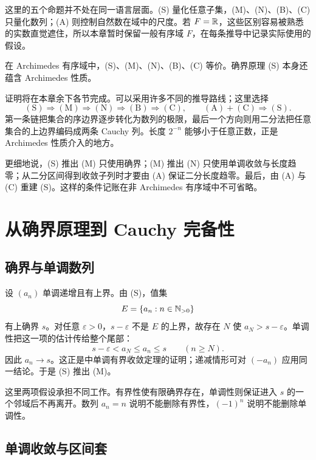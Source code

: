 这里的五个命题并不处在同一语言层面。(S) 量化任意子集，(M)、(N)、(B)、(C) 只量化数列；(A) 则控制自然数在域中的尺度。若 \(F=\mathbb{R}\)，这些区别容易被熟悉的实数直觉遮住，所以本章暂时保留一般有序域 \(F\)，在每条推导中记录实际使用的假设。

\begin{theorem}[完备性命题的等价性]
在 Archimedes 有序域中，(S)、(M)、(N)、(B)、(C) 等价。确界原理 (S) 本身还蕴含 Archimedes 性质。
\end{theorem}

证明将在本章余下各节完成。可以采用许多不同的推导路线；这里选择
\[
 \mathrm{(S)}\Longrightarrow\mathrm{(M)}
 \Longrightarrow\mathrm{(N)}
 \Longrightarrow\mathrm{(B)}
 \Longrightarrow\mathrm{(C)},
 \qquad
 \mathrm{(A)}+\mathrm{(C)}\Longrightarrow\mathrm{(S)}.
\]
第一条链把集合的序边界逐步转化为数列的极限，最后一个方向则用二分法把任意集合的上边界编码成两条 Cauchy 列。长度 \(2^{-n}\) 能够小于任意正数，正是 Archimedes 性质介入的地方。

更细地说，(S) 推出 (M) 只使用确界；(M) 推出 (N) 只使用单调收敛与长度趋零；从二分区间得到收敛子列时才要由 (A) 保证二分长度趋零。最后，由 (A) 与 (C) 重建 (S)。这样的条件记账在非 Archimedes 有序域中不可省略。

\section{从确界原理到 Cauchy 完备性}

\subsection{确界与单调数列}

设 \((a_n)\) 单调递增且有上界。由 (S)，值集
\[
 E=\{a_n:n\in\mathbb{N}_{>0}\}
\]
有上确界 \(s\)。对任意 \(\varepsilon>0\)，\(s-\varepsilon\) 不是 \(E\) 的上界，故存在 \(N\) 使 \(a_N>s-\varepsilon\)。单调性把这一项的估计传给整个尾部：
\[
 s-\varepsilon<a_N\le a_n\le s\qquad(n\ge N).
\]
因此 \(a_n\to s\)。这正是中单调有界收敛定理的证明；递减情形可对 \((-a_n)\) 应用同一结论。于是 (S) 推出 (M)。

这里两项假设承担不同工作。有界性使有限确界存在，单调性则保证进入 \(s\) 的一个邻域后不再离开。数列 \(a_n=n\) 说明不能删除有界性，\((-1)^n\) 说明不能删除单调性。

\subsection{单调收敛与区间套}

